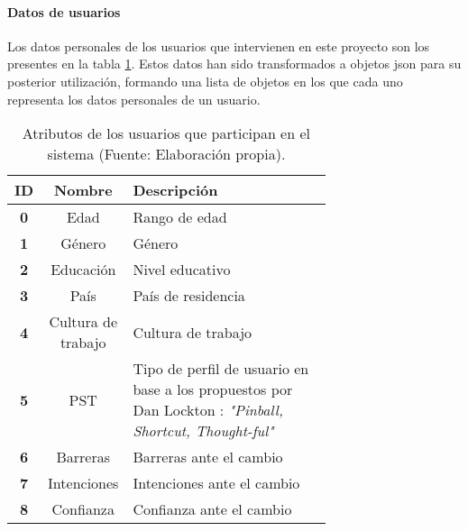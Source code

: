 \paragraph{Datos de usuarios\\}
Los datos personales de los usuarios que intervienen en este proyecto son los presentes en la tabla \ref{tab:AtributosUsuarios}. Estos datos han sido transformados a objetos json para su posterior utilización, formando una lista de objetos en los que cada uno representa los datos personales de un usuario.
\begin{table}[H]
    
    \begin{center}
        \begin{tabular}{|c|c|p{0.7\linewidth}|}
            \hline
            \rowcolor{Cyan} 
            \textbf{ID} & \textbf{Nombre} & \textbf{Descripción}\\ 
            \hline
            \textbf{0} &  Edad & Rango de edad\\
            \hline
            \rowcolor{GrisTabla}
            \textbf{1} & Género & Género\\
            \hline
            \textbf{2} & Educación & Nivel educativo\\
            \hline
            \rowcolor{GrisTabla} 
            \textbf{3} & País & País de residencia\\
            \hline
            \textbf{4} & Cultura de trabajo & Cultura de trabajo\\
            \hline
            \rowcolor{GrisTabla} 
            \textbf{5} & PST & Tipo de perfil de usuario en base a los propuestos por Dan Lockton\autocite{locktonModelsUserDesigners2012} : \textit{"Pinball, Shortcut, Thought-ful"}\\ 
            \hline
            \textbf{6} & Barreras  & Barreras ante el cambio\\
            \hline
            \rowcolor{GrisTabla} 
            \textbf{7} & Intenciones & Intenciones ante el cambio\\
            \hline
            \textbf{8} & Confianza  & Confianza ante el cambio\\
            \hline

        \end{tabular}
        \caption{\centering Atributos de los usuarios que participan en el sistema (Fuente: Elaboración propia).}
        \label{tab:AtributosUsuarios}
    \end{center}    
\end{table}
